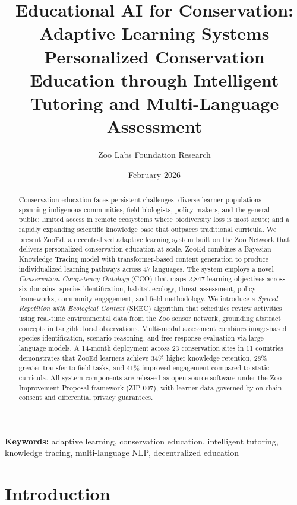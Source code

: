 \documentclass[11pt,a4paper]{article}
\title{\textbf{Educational AI for Conservation: Adaptive Learning Systems} \\[0.5em]
\large Personalized Conservation Education through Intelligent Tutoring and Multi-Language Assessment}
\author[1]{Zoo Labs Foundation Research}
\affil[1]{Zoo Labs Foundation, Research Division \\ \texttt{research@zoo.ngo}}
\date{February 2026}
\begin{document}
\zoocoverpage

\begin{abstract}
\noindent
Conservation education faces persistent challenges: diverse learner populations spanning indigenous communities, field biologists, policy makers, and the general public; limited access in remote ecosystems where biodiversity loss is most acute; and a rapidly expanding scientific knowledge base that outpaces traditional curricula.
We present ZooEd, a decentralized adaptive learning system built on the Zoo Network that delivers personalized conservation education at scale.
ZooEd combines a Bayesian Knowledge Tracing model with transformer-based content generation to produce individualized learning pathways across 47 languages.
The system employs a novel \emph{Conservation Competency Ontology} (CCO) that maps 2,847 learning objectives across six domains: species identification, habitat ecology, threat assessment, policy frameworks, community engagement, and field methodology.
We introduce a \emph{Spaced Repetition with Ecological Context} (SREC) algorithm that schedules review activities using real-time environmental data from the Zoo sensor network, grounding abstract concepts in tangible local observations.
Multi-modal assessment combines image-based species identification, scenario reasoning, and free-response evaluation via large language models.
A 14-month deployment across 23 conservation sites in 11 countries demonstrates that ZooEd learners achieve 34\% higher knowledge retention, 28\% greater transfer to field tasks, and 41\% improved engagement compared to static curricula.
All system components are released as open-source software under the Zoo Improvement Proposal framework (ZIP-007), with learner data governed by on-chain consent and differential privacy guarantees.
\end{abstract}

\vspace{0.5em}
\noindent\textbf{Keywords:} adaptive learning, conservation education, intelligent tutoring, knowledge tracing, multi-language NLP, decentralized education

\section{Introduction}
\label{sec:introduction}
\end{document}
